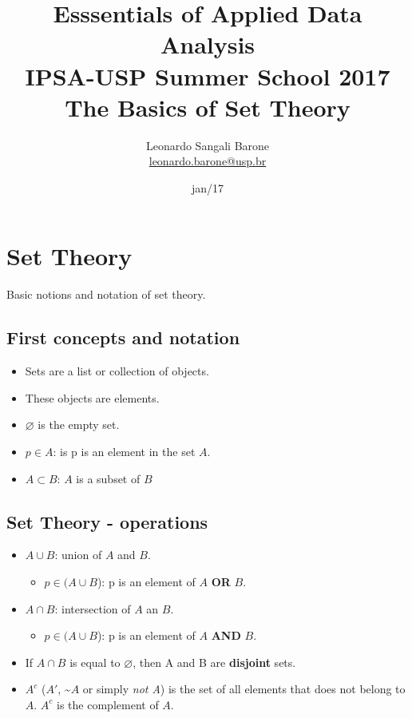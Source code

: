 \documentclass[11pt]{article}
\title{\textbf{Esssentials of Applied Data Analysis\\
				IPSA-USP Summer School 2017}\newline\\
				The Basics of Set Theory}
\author{Leonardo Sangali Barone\\ \href{leonardo.barone@usp.br}{leonardo.barone@usp.br}}
\date{jan/17}
\let\emptyset\varnothing
\begin{document}
\maketitle

\section*{Set Theory}

Basic notions and notation of set theory.

\subsection*{First concepts and notation}

	\begin{itemize}
		\item Sets are a list or collection of objects.
		\item These objects are elements.
		\item $\emptyset$ is the empty set.
		\item $p \in A$: is p is an element in the set $A$.
		\item $A \subset B$: $A$ is a subset of $B$ 
	\end{itemize}


\subsection*{Set Theory - operations}

	\begin{itemize}
		\item $A \cup B$: union of $A$ and $B$.
		\begin{itemize}
			\item $p \in (A \cup B$): p is an element of $A$ \textbf{OR} $B$.
		\end{itemize}
		\item $A \cap B$: intersection of $A$ an $B$.
		\begin{itemize}
			\item $p \in (A \cup B$): p is an element of $A$ \textbf{AND} $B$.
		\end{itemize}
		\item If $A \cap B$ is equal to $\emptyset$, then A and B are \textbf{disjoint} sets.
		\item $A^c$ ($A'$, \textasciitilde$A$ or simply \emph{not A}) is the set of all elements that does not belong to $A$. $A^c$ is the complement of $A$. 

	\end{itemize}
\end{document}
